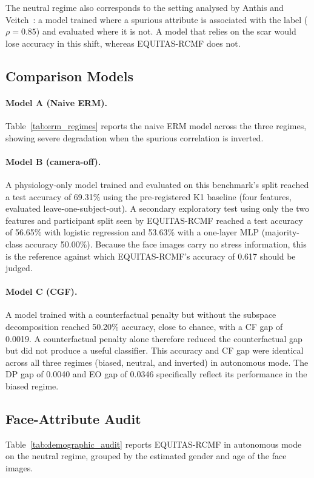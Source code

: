 The neutral regime also corresponds to the setting analysed by Anthis and Veitch~\cite{anthis2023}: a model trained where a spurious attribute is associated with the label ($\rho = 0.85$) and evaluated where it is not. A model that relies on the scar would lose accuracy in this shift, whereas EQUITAS-RCMF does not.

\subsection{Comparison Models}
\paragraph{Model A (Naive ERM).} Table~\ref{tab:erm_regimes} reports the naive ERM model across the three regimes, showing severe degradation when the spurious correlation is inverted.


\paragraph{Model B (camera-off).} A physiology-only model trained and evaluated on this benchmark's split reached a test accuracy of 69.31\% using the pre-registered K1 baseline (four features, evaluated leave-one-subject-out). A secondary exploratory test using only the two features and participant split seen by EQUITAS-RCMF reached a test accuracy of 56.65\% with logistic regression and 53.63\% with a one-layer MLP (majority-class accuracy 50.00\%). Because the face images carry no stress information, this is the reference against which EQUITAS-RCMF's accuracy of 0.617 should be judged.

\paragraph{Model C (CGF).} A model trained with a counterfactual penalty but without the subspace decomposition reached 50.20\% accuracy, close to chance, with a CF gap of 0.0019. A counterfactual penalty alone therefore reduced the counterfactual gap but did not produce a useful classifier.
This accuracy and CF gap were identical across all three regimes (biased, neutral, and inverted) in autonomous mode. The DP gap of 0.0040 and EO gap of 0.0346 specifically reflect its performance in the biased regime.

\subsection{Face-Attribute Audit}
Table~\ref{tab:demographic_audit} reports EQUITAS-RCMF in autonomous mode on the neutral regime, grouped by the estimated gender and age of the face images.

